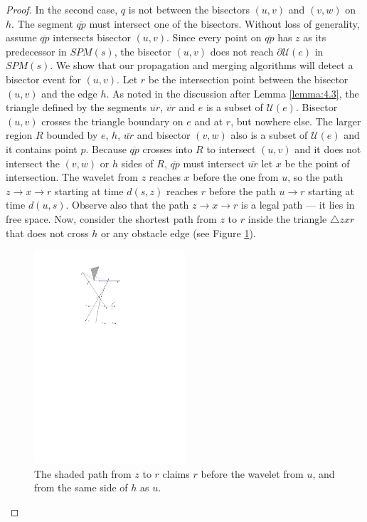 \begin{proof}
	In the second case, $q$ is not between the bisectors $(u,v)$ and $(v,w)$
	on $h$. The segment $\overline{qp}$ must intersect one of the bisectors.
	Without loss of generality, assume $\overline{qp}$ intersects bisector
	$(u,v)$. Since every point on $\overline{qp}$ has $z$ as its predecessor
	in $SPM(s)$, the bisector $(u,v)$ does not reach $\partial\mathcal{U}(e)$
	in $SPM(s)$. We show that our propagation and merging algorithms will
	detect a bisector event for $(u,v)$. Let $r$ be the intersection point
	between the bisector $(u,v)$ and the edge $h$. As noted in the discussion
	after Lemma \ref{lemma:4.3}, the triangle defined by the segments $\overline{ur}$,
	$\overline{vr}$ and $e$ is a subset of $\mathcal{U}(e)$. Bisector $(u,v)$
	crosses the triangle boundary on $e$ and at $r$, but nowhere else. The
	larger region $R$ bounded by $e$, $h$, $\overline{ur}$ and bisector
	$(v,w)$ also is a subset of $\mathcal{U}(e)$ and it contains point $p$.
	Because $\overline{qp}$ crosses into $R$ to intersect $(u,v)$ and it does
	not intersect the $(v,w)$ or $h$ sides of $R$, $\overline{qp}$ must
	intersect $\overline{ur}$ let $x$ be the point of intersection. The
	wavelet from $z$ reaches $x$ before the one from $u$, so the path $z
	\to x \to r$ starting at time $d(s,z)$ reaches $r$ before the path $u \to
	r$ starting at time $d(u,s)$. Observe also that the path $z \to x \to r$
	is a legal path --- it lies in free space. Now, consider the shortest
	path from $z$ to $r$ inside the triangle $\bigtriangleup zxr$ that does
	not cross $h$ or any obstacle edge (see Figure \ref{fig:complexfigure}). 
	
	\begin{figure}[H]
	\centering
	\includegraphics[width=0.5\textwidth]{figures/complexfigure.pdf}
	\caption{The shaded path from $z$ to $r$ claims $r$ before the wavelet
	         from $u$, and from the same side of $h$ as $u$\cite{HershbergerS99}.}
	\label{fig:complexfigure}
    \end{figure}
	

\end{proof}
